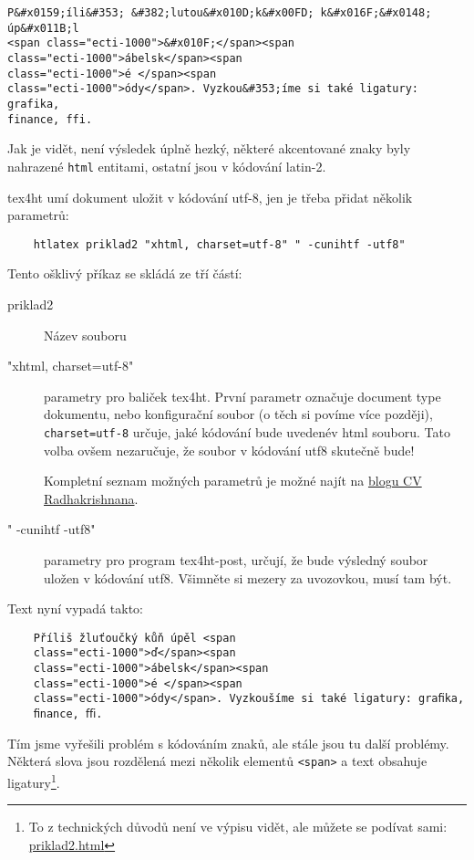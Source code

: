\documentclass{article}
\begin{document}

\begin{verbatim}
P&#x0159;íli&#353; &#382;lutou&#x010D;k&#x00FD; k&#x016F;&#x0148; úp&#x011B;l 
<span class="ecti-1000">&#x010F;</span><span 
class="ecti-1000">ábelsk</span><span 
class="ecti-1000">é </span><span 
class="ecti-1000">ódy</span>. Vyzkou&#353;íme si také ligatury: grafika,
finance, ffi.
\end{verbatim}

Jak je vidět, není výsledek úplně hezký, některé akcentované znaky byly
nahrazené \verb|html| entitami, ostatní jsou v kódování latin-2.

\gls{tex4ht} umí dokument uložit v kódování utf-8, jen je třeba přidat několik
parametrů:

\begin{verbatim}
	htlatex priklad2 "xhtml, charset=utf-8" " -cunihtf -utf8"
\end{verbatim}

Tento ošklivý příkaz se skládá ze tří částí:

\begin{description}
	\item[priklad2] Název souboru
	\item["xhtml, charset=utf-8"] parametry pro baliček \gls{tex4ht}. 
		První parametr označuje document type dokumentu, nebo konfigurační soubor 
		(o těch si povíme více později), 
		\verb|charset=utf-8| určuje, jaké kódování bude uvedenév html souboru. 
	 Tato volba ovšem nezaručuje, že soubor v kódování utf8 skutečně bude!

	 Kompletní seznam možných parametrů je možné najít na 
	 \href{http://www.cvr.cc/?p=504}{blogu CV Radhakrishnana}.
 \item[" -cunihtf -utf8"] parametry pro program \gls{tex4ht-post},
    určují, že bude výsledný soubor uložen v kódování utf8. Všimněte si mezery
    za uvozovkou, musí tam být.
\end{description}		

Text nyní vypadá takto:

\begin{verbatim}
	Příliš žluťoučký kůň úpěl <span 
	class="ecti-1000">ď</span><span 
	class="ecti-1000">ábelsk</span><span 
	class="ecti-1000">é </span><span 
	class="ecti-1000">ódy</span>. Vyzkoušíme si také ligatury: graﬁka,
	ﬁnance, ﬃ.
\end{verbatim}

Tím jsme vyřešili problém s kódováním znaků, ale stále jsou tu další problémy.
Některá slova jsou rozdělená mezi několik elementů \verb|<span>| a text 
obsahuje ligatury\footnote{To z technických důvodů není ve výpisu vidět, 
	ale můžete se podívat sami: \href{priklady/priklad2.html}{priklad2.html}}.
\end{document}
